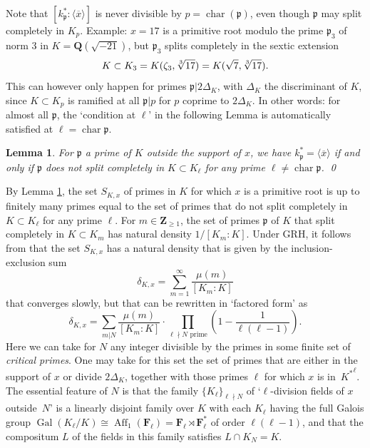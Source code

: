 \documentclass{amsart}
\theoremstyle{plain}
\newtheorem{lemma}[theorem]{Lemma}
\theoremstyle{definition}
\DeclareMathOperator{\Aff}{Aff}
\DeclareMathOperator{\characteristic}{char}
\DeclareMathOperator{\Gal}{Gal}
\newcommand{\FF}{{\mathbf{F}}}
\newcommand{\Que}{{\mathbf{Q}}}
\newcommand{\Zee}{{\mathbf{Z}}}
\newcommand{\gothp}{{\mathfrak{p}}}
\begin{document}
Note that $[k_\gothp^*:\langle \overline x\rangle]$ is 
never divisible by $p=\characteristic(\gothp)$, even though
$\gothp$ may split completely in $K_p$.
Example: $x=17$ is a primitive root modulo the prime
$\gothp_3$ of norm 3 in $K=\Que(\sqrt{-21})$, but $\gothp_3$
splits completely in the sextic extension
\[
K\subset K_3=
K(\zeta_3,\root 3\of {17})= K(\sqrt 7,\root 3\of {17}).
\]
This can however only happen for primes 
$\gothp|2\Delta_K$, with $\Delta_K$ the discriminant of $K$, since $K\subset K_p$ is ramified at all $\gothp|p$ 
for $p$ coprime to $2\Delta_K$.
In other words: for almost all $\gothp$,
the `condition at $\ell$' in the following Lemma is
automatically satisfied at $\ell=\characteristic{\gothp}$.
%
\begin{lemma}
\label{primrootatell}
For $\gothp$ a prime of $K$ outside the support of $x$, we have
$
k_\gothp^*=\langle \overline x\rangle $
if and only if $\gothp$ does not split completely in
$K\subset K_\ell$ for any prime $\ell\ne\characteristic{\gothp}$.
\qed
\end{lemma}
\noindent
By Lemma \ref{primrootatell}, the set $S_{K, x}$ of primes in $K$ for which $x$ is a primitive root is up to finitely many primes equal to the set of primes that do not split completely in $K\subset K_\ell$
for any prime $\ell$.
For $m\in\Zee_{\ge1}$, the set of primes $\gothp$ of $K$ that split completely in $K\subset K_m$
has natural density $1/[K_m:K]$.
Under GRH, it follows from \cite{Lenstra} that the set $S_{K, x}$ has a natural density that is given by 
the inclusion-exclusion sum
\begin{equation}
\label{deltaKx}
\delta_{K,x}=
\sum_{m=1}^{\infty} \frac{\mu(m)}{[K_m:K]}
\end{equation}
that converges slowly, but that can be rewritten in `factored form' as
\begin{equation}
\label{deltaKx-factored}
\delta_{K,x}=
\sum_{m|N} \frac{\mu(m)}{[K_m:K]}\cdot
   \prod_{\ell\nmid N \text{ prime}} (1-\frac{1}{\ell(\ell-1)}).
\end{equation}
Here we can take for $N$ any integer 
divisible by the primes in some finite set of \emph{critical primes}.
One may take for this set the set of primes that are either in the support of $x$ or 
divide $2\Delta_K$,  
together with those primes $\ell$ for which $x$ is in~${K^*}^\ell$.
The essential feature of $N$ is that the family 
$\{K_\ell\}_{\ell\nmid N}$ of `$\ell$-division fields of $x$
outside~$N$' is a linearly disjoint family over $K$ 
with each $K_\ell$ having the full Galois group 
$\Gal(K_\ell/K)\cong \Aff_1(\FF_\ell)=\FF_\ell\rtimes \FF_\ell^*$
of order $\ell(\ell-1)$, and that the compositum $L$ 
of the fields in this family satisfies $L\cap K_N=K$.
\end{document}
